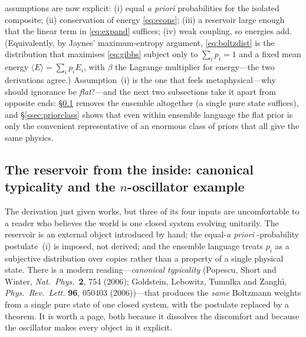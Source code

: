 \documentclass[11pt,a4paper]{article}
\theoremstyle{definition}
\begin{document}
assumptions are now explicit: (i) equal \emph{a priori} probabilities for the
isolated composite; (ii) conservation of energy \eqref{eq:econs}; (iii) a
reservoir large enough that the linear term in \eqref{eq:expand} suffices; (iv)
weak coupling, so energies add. (Equivalently, by Jaynes' maximum-entropy
argument, \eqref{eq:boltzdist} is the distribution that maximises
\eqref{eq:gibbs} subject only to $\sum_i p_i=1$ and a fixed mean energy
$\langle E\rangle=\sum_i p_iE_i$, with $\beta$ the Lagrange multiplier for
energy---the two derivations agree.) Assumption~(i) is the one that feels
metaphysical---why should ignorance be \emph{flat}?---and the next two
subsections take it apart from opposite ends: \S\ref{ssec:typicality} removes
the ensemble altogether (a single pure state suffices), and
\S\ref{ssec:priorclass} shows that even within ensemble language the flat
prior is only the convenient representative of an enormous class of priors
that all give the same physics.

\subsection{The reservoir from the inside: canonical typicality and the
\texorpdfstring{$n$}{n}-oscillator example}\label{ssec:typicality}

The derivation just given works, but three of its four inputs are uncomfortable
to a reader who believes the world is one closed system evolving unitarily. The
reservoir is an external object introduced by hand; the equal-\emph{a priori}
-probability postulate~(i) is imposed, not derived; and the ensemble language
treats $p_i$ as a subjective distribution over copies rather than a property of
a single physical state. There is a modern reading---\emph{canonical
typicality} (Popescu, Short and Winter, \emph{Nat.\ Phys.}~\textbf{2}, 754
(2006); Goldstein, Lebowitz, Tumulka and Zangh\`i, \emph{Phys.\ Rev.\ Lett.}
\textbf{96}, 050403 (2006))---that produces the \emph{same} Boltzmann weights
from a single pure state of one closed system, with the postulate replaced by a
theorem. It is worth a page, both because it dissolves the discomfort and
because the oscillator makes every object in it explicit.
\end{document}
